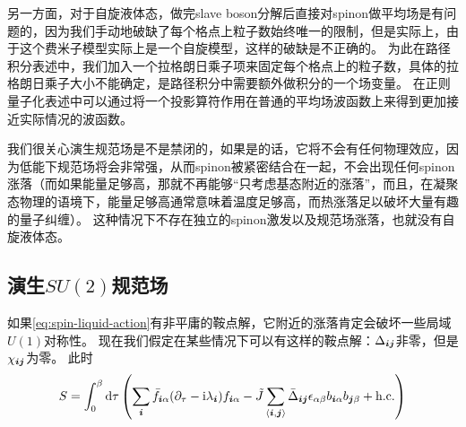 另一方面，对于自旋液体态，做完slave boson分解后直接对spinon做平均场是有问题的，因为我们手动地破缺了每个格点上粒子数始终唯一的限制，但是实际上，由于这个费米子模型实际上是一个自旋模型，这样的破缺是不正确的。
为此在路径积分表述中，我们加入一个拉格朗日乘子项来固定每个格点上的粒子数，具体的拉格朗日乘子大小不能确定，是路径积分中需要额外做积分的一个场变量。
在正则量子化表述中可以通过将一个投影算符作用在普通的平均场波函数上来得到更加接近实际情况的波函数。

我们很关心演生规范场是不是禁闭的，如果是的话，它将不会有任何物理效应，因为低能下规范场将会非常强，从而spinon被紧密结合在一起，不会出现任何spinon涨落（而如果能量足够高，那就不再能够“只考虑基态附近的涨落”，而且，在凝聚态物理的语境下，能量足够高通常意味着温度足够高，而热涨落足以破坏大量有趣的量子纠缠）。
这种情况下不存在独立的spinon激发以及规范场涨落，也就没有自旋液体态。

\subsection{演生$SU(2)$规范场}

如果\eqref{eq:spin-liquid-action}有非平庸的鞍点解，它附近的涨落肯定会破坏一些局域$U(1)$对称性。
现在我们假定在某些情况下可以有这样的鞍点解：$\Delta_{\vb*{i} \vb*{j}}$非零，但是$\chi_{\vb*{i} \vb*{j}}$为零。
此时
\begin{equation}
    S = \int_0^\beta \dd{\tau} \left( \sum_{\vb*{i}} \bar{f}_{\vb*{i} \alpha} (\partial_\tau - \mathrm{i} \lambda_{\vb*{i}}) f_{\vb*{i} \alpha} - \tilde{J} \sum_{\langle \vb*{i}, \vb*{j} \rangle} \bar{\Delta}_{\vb*{i} \vb*{j}} \epsilon_{\alpha \beta} b_{\vb*{i} \alpha} b_{\vb*{j} \beta} + \text{h.c.} \right)
\end{equation}


